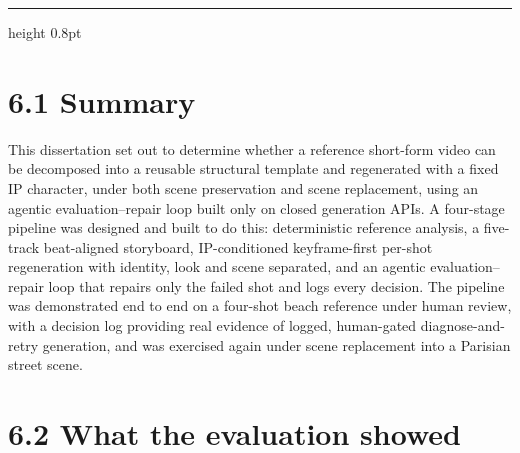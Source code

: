 \documentclass[10pt,twocolumn,letterpaper]{article}
\begin{document}
\par\vspace{22pt}

\vspace*{2pt}\vspace{3pt}\hrule height 0.8pt\vspace{12pt}


\section*{6.1 Summary}

This dissertation set out to determine whether a reference short-form video can be decomposed into a reusable structural template and regenerated with a fixed IP character, under both scene preservation and scene replacement, using an agentic evaluation--repair loop built only on closed generation APIs. A four-stage pipeline was designed and built to do this: deterministic reference analysis, a five-track beat-aligned storyboard, IP-conditioned keyframe-first per-shot regeneration with identity, look and scene separated, and an agentic evaluation--repair loop that repairs only the failed shot and logs every decision. The pipeline was demonstrated end to end on a four-shot beach reference under human review, with a decision log providing real evidence of logged, human-gated diagnose-and-retry generation, and was exercised again under scene replacement into a Parisian street scene.


\section*{6.2 What the evaluation showed}
\end{document}
